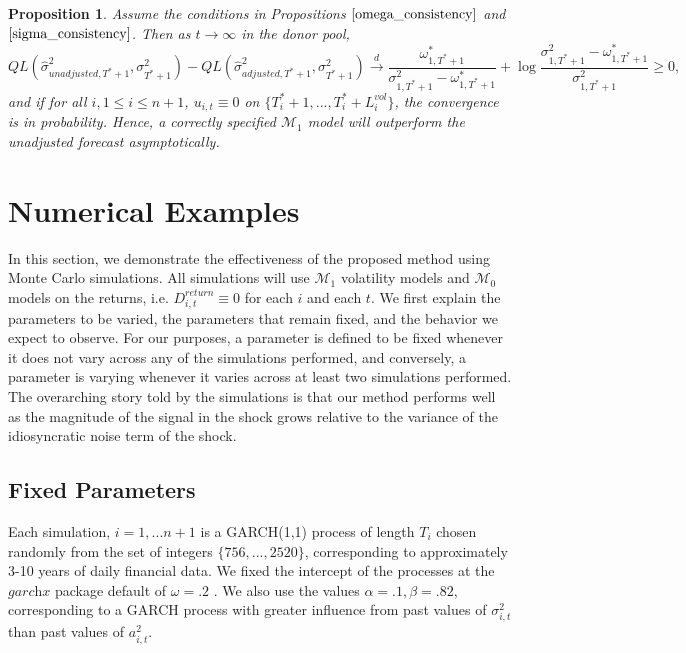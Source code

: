 \documentclass{uiucthesis2021}
\def\mc#1{\mathcal{#1}} %
\def\mc#1{\mathcal{#1}}
\newtheorem{prop}{Proposition}
\theoremstyle{definition}
\begin{document}
\begin{prop}\label{asymptotic_consistency}
Assume the conditions in Propositions $\ref{omega_consistency}$ and $\ref{sigma_consistency}$.  Then as $t\rightarrow \infty$ in the donor pool,
$$QL(\hat\sigma_{unadjusted,T^{*}+1}^{2},\sigma^{2}_{T^{*}+1})-QL(\hat\sigma^{2}_{adjusted,T^{*}+1},\sigma^{2}_{T^{*}+1}) \overset{d}{\longrightarrow} \frac{\omega_{1,T^{*}+1}^{*}}{\sigma^{2}_{1,T^{*}+1}-\omega_{1,T^{*}+1}^{*}} + \log{\frac{\sigma_{1,T^{*}+1}^{2}-\omega_{1,T^{*}+1}^{*}}{\sigma_{1,T^{*}+1}^{2}} } \geq 0,$$ and if for all $i, 1 \leq i \leq n+ 1$, $u_{i,t} \equiv 0$ on $\{T^{*}_{i}+1,... ,T^{*}_{i}+L_{i}^{vol}\}$, the convergence is in probability.  Hence, a correctly specified $\mc{M}_1$ model will outperform the unadjusted forecast asymptotically.
\end{prop}

\section{Numerical Examples}

In this section, we demonstrate the effectiveness of the proposed method using Monte Carlo simulations.  All simulations will use $\mc{M}_1$ volatility models and $\mc{M}_0$ models on the returns, i.e. $  D^{return}_{i,t} \equiv 0$ for each $i$ and each $t$.  We first explain the parameters to be varied, the parameters that remain fixed, and the behavior we expect to observe.  For our purposes, a parameter is defined to be fixed whenever it does not vary across any of the simulations performed, and conversely, a parameter is varying whenever it varies across at least two simulations performed. The overarching story told by the simulations is that our method performs well as the magnitude of the signal in the shock grows relative to the variance of the idiosyncratic noise term of the shock. 

  \subsection{Fixed Parameters}
Each simulation, $i=1,...n+1$ is a GARCH(1,1) process of length $T_{i}$ chosen randomly from the set of integers $\{756,...,2520\}$, corresponding to approximately 3-10 years of daily financial data.  We fixed the intercept of the processes at the $\textit{garchx}$ package default of $\omega = .2$ \citep{RePEc:pra:mprapa:100301}.  We also use the values $\alpha=.1, \beta = .82$, corresponding to a GARCH process with greater influence from past values of $\sigma^{2}_{i,t}$ than past values of $a^{2}_{i,t}$.
\end{document}

